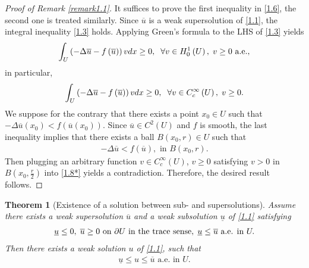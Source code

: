 \documentclass[11pt,a4paper,center,notitlepage]{article}
\numberwithin{equation}{section}
\newtheorem{theorem}{Theorem}[section]
\begin{document}
\begin{proof}[Proof of Remark \ref{remark1.1}]
It suffices to prove the first inequality in \eqref{1.6}, the second one is treated similarly. Since $\overline{u}$ is a weak supersolution of \eqref{1.1}, the integral inequality \eqref{1.3} holds. Applying Green's formula to the LHS of \eqref{1.3} yields
\begin{align}
\int_U {\left( { - \Delta \overline u  - f\left( {\overline u } \right)} \right)vdx}  \ge 0,\hspace{2mm}\forall v \in H_0^1\left( U \right),\hspace{1mm}v \ge 0 \mbox{ a.e.},
\end{align}
in particular,
\begin{align}
\label{1.8*}
\int_U {\left( { - \Delta \overline u  - f\left( {\overline u } \right)} \right)vdx}  \ge 0,\hspace{2mm}\forall v \in C_c^\infty \left( U \right),\hspace{1mm}v \ge 0.
\end{align}
We suppose for the contrary that there exists a point $x_0 \in U$ such that $ - \Delta \overline u \left( {{x_0}} \right) < f\left( {\overline u \left( {{x_0}} \right)} \right)$. Since $\overline{u} \in C^2 \left(U\right)$ and $f$ is smooth, the last inequality implies that there exists a ball $B\left(x_0,r\right) \in U$ such that 
\begin{align}
 - \Delta \overline u  < f\left( {\overline u } \right),\mbox{ in } B\left( {{x_0},r} \right).
\end{align}
Then plugging an arbitrary function $v\in C_c^\infty \left(U\right)$, $v\ge 0$ satisfying $v > 0$ in $B\left(x_0,\frac{r}{2}\right)$ into \eqref{1.8*} yields a contradiction. Therefore, the desired result follows.
\end{proof}
\begin{theorem}[Existence of a solution between sub- and supersolutions]\label{theorem1.1}
Assume there exists a weak supersolution $\overline{u}$ and a weak subsolution $\underline{u}$ of \eqref{1.1} satisfying
\begin{align}
\label{1.8}
\underline u  \le 0,\hspace{1mm}\overline u  \ge 0 \mbox{ on } \partial U \mbox{ in the trace sense}, \hspace{1mm}\underline u  \le \overline u \mbox{ a.e. in } U.
\end{align}
Then there exists a weak solution $u$ of \eqref{1.1}, such that 
\begin{align}
\underline{u} \le u\le \overline{u} \mbox{ a.e. in } U.
\end{align}
\end{theorem}
\end{document}
